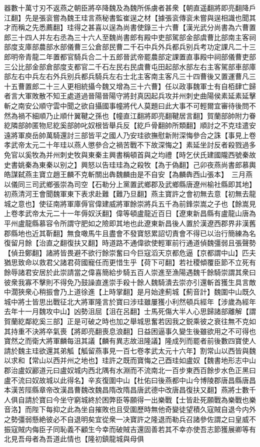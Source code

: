 器數十萬寸刃不返燕之朝臣將卒降魏及為魏所係虜者甚衆【朝直遥翻將即亮翻降戶江翻】先是張衮嘗為魏王珪言燕秘書監崔逞之材【據張衮傳衮未嘗與逞相識也聞其才而稱之先悉薦翻】珪得之甚喜以逞為尚書使錄三十六曹【漢光武分尚書為六曹置郎三十四人并左右丞為三十六人至魏尚書郎有殿中吏部駕部金部虞曹比部南主客祠部度支庫部農部水部儀曹三公倉部民曹二千石中兵外兵都兵别兵考功定課凡二十三郎明帝青龍二年置都官騎兵合二十五郎晉武帝罷農部定課置直事殿中祠部儀曹吏部三公比部金部倉部度支都官二千石左民右民虞曹屯田起部水部左右主客駕部車部庫部左右中兵左右外兵别兵都兵騎兵左右士北主客南主客凡三十四曹後又置運曹凡三十五曹置郎二十三人更相統攝今魏又增為三十六曹】任以政事魏軍士有自栢肆亡歸者言大軍敗散不知王處道過晉陽晉陽守將封真因起兵攻并州刺史曲陽侯素延素延擊斬之南安公順守雲中聞之欲自攝國事幢將代人莫題曰此大事不可輕爾宜審待後問不然為禍不細順乃止順什翼鞬之孫也【幢直江翻將即亮翻鞬居言翻】賀蘭部帥附力眷紇隣部帥匿物尼紇奚部帥叱奴根皆舉兵反【紇戶骨翻帥所類翻】順討之不克珪遣安遠將軍庾岳帥萬騎還討三部皆平之國人乃安珪欲撫慰新附深悔參合之誅【事見上卷孝武帝太元二十年珪以燕人懲參合之禍苦戰不下故深悔之】素延坐討反者殺戮過多免官以奚牧為并州刺史牧與東秦主興書稱頓首與之均禮【時乞伏氏建國隴西號秦故史書姚秦為東秦以别之】興怒以告珪珪為之殺牧【為于偽翻】己卯夜燕尚書郎慕輿皓謀弑燕主寶立趙王麟不克斬關出犇魏麟由是不自安【為麟犇西山張本】　三月燕以儀同三司武鄉張崇為司空【石勒分上黨置武鄉郡及武鄉縣唐遼州榆社縣即其地】　初燕清河王會聞魏軍東下表求赴難【難乃旦翻】燕主寶許之會初無去意【初無去龍城之意也】使征南將軍庫傉官偉建威將軍餘崇將兵五千為前鋒崇嵩之子也【餘嵩見上卷孝武帝太元二十一年傉奴沃翻】偉等頓盧龍近百日【遼東新昌縣有盧龍山唐為平州盧龍縣慕容令所謂守肥如之險即其地也此遼東新昌後人置於漢遼西郡界非漢舊郡縣地也近其靳翻】無食噉馬牛且盡會不發寶怒累詔切責會不得已以治行簡練為名復留月餘【治直之翻復扶又翻】時道路不通偉欲使輕軍前行通道偵魏彊弱且張聲勢【偵丑鄭翻】諸將皆畏避不欲行餘崇奮曰今巨寇滔天京都危逼【京都謂中山】匹夫猶思致命以救君父諸君荷國寵任而更惜生乎【荷下可翻】若社稷傾覆臣節不立死有餘辱諸君安居於此崇請當之偉喜簡給步騎五百人崇進至漁陽遇魏千餘騎崇謂其衆曰彼衆我寡不擊則不得免乃鼓譟直進崇手殺十餘人魏騎潰去崇亦引還斬首獲生具言敵中濶狹衆心稍振會乃上道徐進【上時掌翻】是月始達薊城【薊音計】魏圍中山既久城中將士皆思出戰征北大將軍隆言於寶曰涉珪雖屢獲小利然頓兵經年【涉歲為經年去年十一月魏攻中山】凶勢沮屈【沮在呂翻】士馬死傷大半人心思歸諸部離解【謂賀蘭紇鄰紇奚三部】正是可破之時也加之舉城思奮若因我之鋭乘彼之衰往無不克如其持重不決將卒氣喪【將即亮翻喪息浪翻】日益困逼事久變生後雖欲用之不可得也寶然之而衛大將軍麟每沮其議【麟有異志故沮隆議】隆成列而罷者前後數四寶使人請於魏主珪欲還其弟觚【觚留燕事見一百七卷孝武太元十六年】割常山以西皆與魏以求和【常山以西并州之地也】珪許之既而寶悔之己酉珪如盧奴【魏書地形志中山郡治盧奴酈道元曰盧奴城内西北隅有水淵而不流南北一百步東西百餘步水色正黑曰盧不流曰奴故城以此得名】辛亥復圍中山【杜佑曰後燕都中山今博陵郡唐昌縣唐昌本漢苦陘縣章帝改漢昌曹魏改魏昌隋改隋昌唐武德中改唐昌復扶又翻】燕將士數千人俱自請於寶曰今坐守窮城終於困弊臣等願得一出樂戰【士皆赴死願戰為樂戰也樂音洛】而陛下每抑之此為坐自摧敗也且受圍歷時無他奇變徒望積久寇賊自退今内外之勢彊弱懸絶彼必不自退明矣宜從衆一决寶許之隆退而勒兵召諸參佐謂之曰皇威不振寇賊内侮臣子同恥義不顧生今幸而破賊吉還固善若其不幸亦使吾志節獲展卿等有北見吾母者為吾道此情也【隆初鎮龍城與母俱